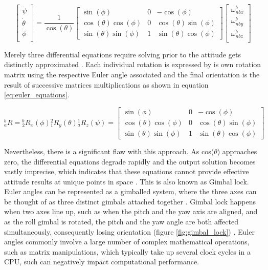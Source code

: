 \begin{equation}
    \begin{bmatrix}
        \dot{\psi}   \\
        \dot{\theta} \\
        \dot{\phi}   \\
    \end{bmatrix}
    =
    \frac{1}{\cos(\theta)}
    \begin{bmatrix}
        \sin(\phi)             & 0 & -\cos(\phi)            \\
        \cos(\theta)\cos(\phi) & 0 & \cos(\theta)\sin(\phi) \\
        \sin(\theta)\sin(\phi) & 1 & \sin(\theta)\cos(\phi)
    \end{bmatrix}
    \begin{bmatrix}
        \omega{^b_{nbx}} \\
        \omega{^b_{nby}} \\
        \omega{^b_{nbz}} \\
    \end{bmatrix}
    \label{eq:euler_equation}
\end{equation}

Merely three differential equations require solving prior to the attitude gets distinctly approximated \cite{bar1985attitude}. Each individual rotation is expressed by is own rotation matrix using the respective Euler angle associated and the final orientation is the result of successive matrices multiplications as shown in equation \ref{eq:euler_equations}.

\begin{equation}
    {^b_a}R = {^b_2}R_x(\phi){^2_1}R_y(\theta){^1_a}R_z(\psi)
    =
    \begin{bmatrix}
        \sin(\phi)             & 0 & -\cos(\phi)            \\
        \cos(\theta)\cos(\phi) & 0 & \cos(\theta)\sin(\phi) \\
        \sin(\theta)\sin(\phi) & 1 & \sin(\theta)\cos(\phi)
    \end{bmatrix}
    \label{eq:euler_equations}
\end{equation}

Nevertheless, there is a significant flaw with this approach. As cos($\theta$) approaches zero, the differential equations degrade rapidly and the output solution becomes vastly imprecise, which indicates that these equations cannot provide effective attitude results at unique points in space \cite{spring1986euler}. This is also known as Gimbal lock. Euler angles can be represented as a gimballed system, where the three axes can be thought of as three distinct gimbals attached together \cite{mcconnell1967kinematics}. Gimbal lock happens when two axes line up, such as when the pitch and the yaw axis are aligned, and as the roll gimbal is rotated, the pitch and the yaw angle are both affected simultaneously, consequently losing orientation (figure \ref{fig:gimbal_lock}) \cite{hemingway2018perspectives}.
Euler angles commonly involve a large number of complex mathematical operations, such as matrix manipulations, which typically take up several clock cycles in a CPU, such can negatively impact computational performance.

